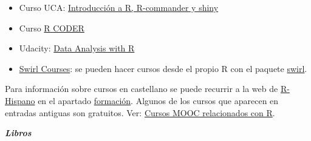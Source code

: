 \documentclass[
]{book}
\providecommand{\tightlist}{%
  \setlength{\itemsep}{0pt}\setlength{\parskip}{0pt}}
\theoremstyle{break}
\theoremstyle{definition}
\theoremstyle{definition}
\theoremstyle{definition}
\theoremstyle{definition}
\theoremstyle{remark}
\begin{document}
\begin{itemize}
\tightlist
\item
  Curso UCA: \href{http://knuth.uca.es/moodle/course/view.php?id=51}{Introducción a R, R-commander y shiny}
\end{itemize}

\begin{itemize}
\tightlist
\item
  Curso \href{https://r-coder.com/curso-r}{R CODER}
\end{itemize}

\begin{itemize}
\tightlist
\item
  Udacity: \href{https://eu.udacity.com/course/data-analysis-with-r--ud651}{Data Analysis with R}
\end{itemize}

\begin{itemize}
\tightlist
\item
  \href{https://swirlstats.com/scn/title.html}{Swirl Courses}:
  se pueden hacer cursos desde el propio R con el paquete
  \href{https://swirlstats.com}{swirl}.
\end{itemize}

Para información sobre cursos en castellano se puede recurrir a la web de \href{http://r-es.org/}{R-Hispano} en el apartado \href{http://r-es.org/category/formacion}{formación}. Algunos de los cursos que aparecen en entradas antiguas son gratuitos.
Ver: \href{http://r-es.org/2016/02/12/cursos-masivos-y-otra-formacion-on-line-sobre-r/}{Cursos MOOC relacionados con R}.

\textbf{\emph{Libros}}
\end{document}
